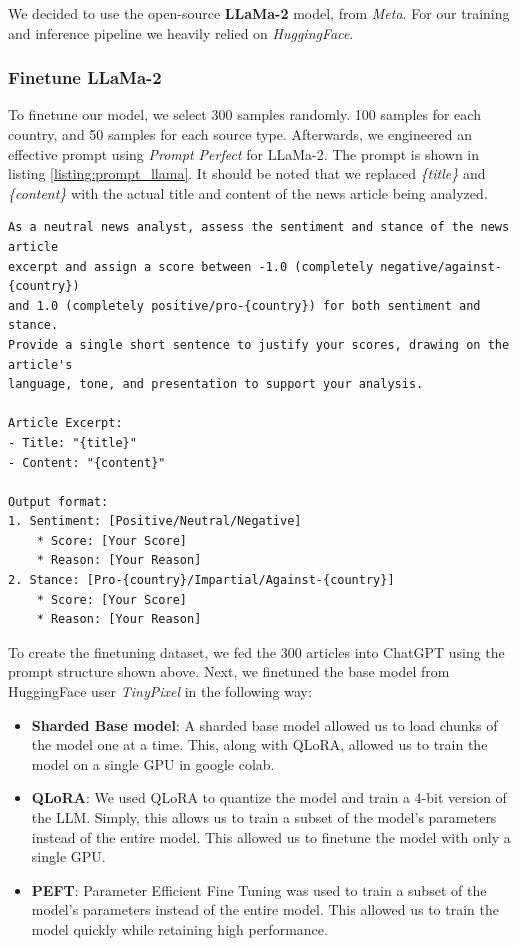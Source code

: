 \documentclass{article}
\theoremstyle{mytheoremstyle}
\theoremstyle{mytheoremstyle}
\theoremstyle{myproblemstyle}
\begin{document}
    We decided to use the open-source \textbf{LLaMa-2} model, from \emph{Meta}. For our training and inference pipeline we heavily relied on \emph{HuggingFace}.

    \subsubsection{Finetune LLaMa-2}

    To finetune our model, we select 300 samples randomly. 100 samples for each country, and 50 samples for each source type. Afterwards, we engineered an effective prompt using \emph{Prompt Perfect} for LLaMa-2. The prompt is shown in listing \ref{listing:prompt_llama}. It should be noted that we replaced \emph{\{title\}} and \emph{\{content\}} with the actual title and content of the news article being analyzed.

    \begin{lstlisting}[caption=Prompt for LLaMa, label={listing:prompt_llama}]
As a neutral news analyst, assess the sentiment and stance of the news article
excerpt and assign a score between -1.0 (completely negative/against-{country}) 
and 1.0 (completely positive/pro-{country}) for both sentiment and stance. 
Provide a single short sentence to justify your scores, drawing on the article's
language, tone, and presentation to support your analysis.

Article Excerpt:
- Title: "{title}"
- Content: "{content}"

Output format: 
1. Sentiment: [Positive/Neutral/Negative]
    * Score: [Your Score]
    * Reason: [Your Reason] 
2. Stance: [Pro-{country}/Impartial/Against-{country}]
    * Score: [Your Score]
    * Reason: [Your Reason]
    \end{lstlisting}
    
    To create the finetuning dataset, we fed the 300 articles into ChatGPT using the prompt structure shown above. Next, we finetuned the base model from HuggingFace user \emph{TinyPixel} in the following way:

    \begin{itemize}
        \item \textbf{Sharded Base model}: A sharded base model allowed us to load chunks of the model one at a time. This, along with QLoRA, allowed us to train the model on a single GPU in google colab.
        \item \textbf{QLoRA}: We used QLoRA to quantize the model and train a 4-bit version of the LLM. Simply, this allows us to train a subset of the model's parameters instead of the entire model. This allowed us to finetune the model with only a single GPU. \cite{dettmers2023qlora}
        \item \textbf{PEFT}: Parameter Efficient Fine Tuning was used to train a subset of the model's parameters instead of the entire model. This allowed us to train the model quickly while retaining high performance.
    \end{itemize}
\end{document}
